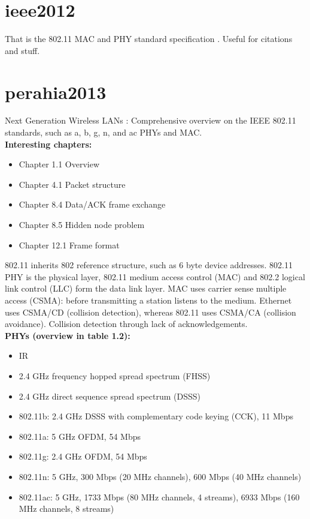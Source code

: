
\section*{ieee2012}

That is the 802.11 MAC and PHY standard specification \cite{ieee2012}. Useful for citations and stuff.



\section*{perahia2013}

Next Generation Wireless LANs \cite{perahia2013}: Comprehensive overview on the IEEE 802.11 standards, such as a, b, g, n, and ac PHYs and MAC.\\

\textbf{Interesting chapters:}

\begin{itemize}
	\item Chapter 1.1 Overview
	\item Chapter 4.1 Packet structure
	\item Chapter 8.4 Data/ACK frame exchange
	\item Chapter 8.5 Hidden node problem
	\item Chapter 12.1 Frame format
\end{itemize}

802.11 inherits 802 reference structure, such as 6 byte device addresses. 802.11 PHY is the physical layer, 802.11 medium access control (MAC) and 802.2 logical link control (LLC) form the data link layer. MAC uses carrier sense multiple access (CSMA): before transmitting a station listens to the medium. Ethernet uses CSMA/CD (collision detection), whereas 802.11 uses CSMA/CA (collision avoidance). Collision detection through lack of acknowledgements.\\

\textbf{PHYs (overview in \cite{perahia2013} table 1.2):}

\begin{itemize}
	\item IR
	\item 2.4 GHz frequency hopped spread spectrum (FHSS)
	\item 2.4 GHz direct sequence spread spectrum (DSSS)
	\item 802.11b: 2.4 GHz DSSS with complementary code keying (CCK), 11 Mbps
	\item 802.11a: 5 GHz OFDM, 54 Mbps
	\item 802.11g: 2.4 GHz OFDM, 54 Mbps
	\item 802.11n: 5 GHz, 300 Mbps (20 MHz channels), 600 Mbps (40 MHz channels)
	\item 802.11ac: 5 GHz, 1733 Mbps (80 MHz channels, 4 streams), 6933 Mbps (160 MHz channels, 8 streams)
\end{itemize}

